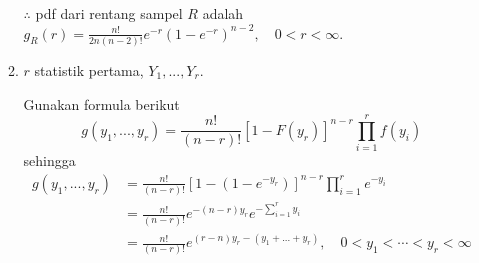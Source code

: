 \documentclass{exam}
\begin{document}
\begin{enumerate}
\begin{enumerate}
\begin{solution}
                $\therefore$ pdf dari rentang sampel $R$ adalah $\displaystyle g_R(r)=\frac{n!}{2n(n-2)!}e^{-r}(1-e^{-r})^{n-2}, \quad 0<r<\infty$.
            \end{solution}
            \item $r$ statistik pertama, $Y_1,...,Y_r$.
            \begin{solution}
                Gunakan formula berikut
                \[g(y_1,...,y_r)=\frac{n!}{(n-r)!}[1-F(y_r)]^{n-r}\prod_{i=1}^r f(y_i)\]
                sehingga
                \begin{align*}
                    g(y_1,...,y_r) &= \frac{n!}{(n-r)!}[1-(1-e^{-y_r})]^{n-r}\prod_{i=1}^r e^{-y_i}\\
                    &= \frac{n!}{(n-r)!}e^{-(n-r)y_r}e^{-\sum_{i=1}^r y_i}\\
                    &= \frac{n!}{(n-r)!}e^{(r-n)y_r-(y_1+...+y_r)},\quad 0<y_1<\cdots<y_r<\infty
                \end{align*}
            \end{solution}
        \end{enumerate}
    \end{enumerate}
\end{document}

